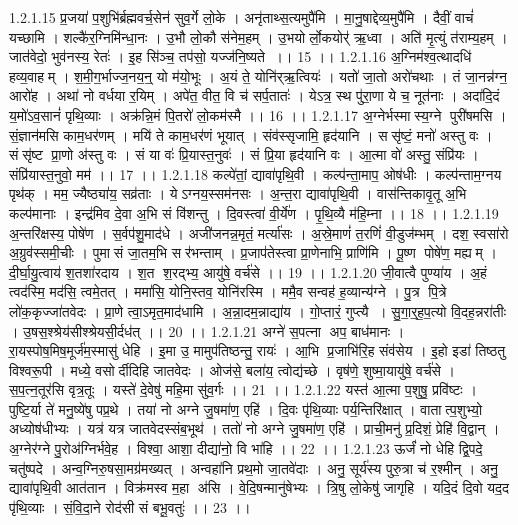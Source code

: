 1.2.1.15
प्र॒जया॑ प॒शुभि॑र्ब्रह्मवर्च॒सेन॑ सुव॒र्गे लो॒के । अनृ॑ताथ्स॒त्यमुपै॑मि । मा॒नु॒षाद्देव्य॒मुपै॑मि । दैवीं॒ वाचं॑ यच्छामि । शल्कै॑र॒ग्निमि॑न्धा॒नः । उ॒भौ लो॒कौ स॑नेम॒हम् । उ॒भयोर्लो॒कयोर्॑ ऋ॒ध्वा । अति॑ मृ॒त्युं त॑राम्य॒हम् । जात॑वेदो॒ भुव॑नस्य॒ रेतः॑ । इ॒ह सि॑ञ्च॒ तप॑सो॒ यज्ज॑नि॒ष्यते ।। 15 ।।
1.2.1.16
अ॒ग्निम॑श्व॒त्थादधि॑ हव्य॒वाहम् । श॒मी॒ग॒र्भाज्ज॒नय॒न्॒ यो म॑यो॒भूः । अ॒यं ते॒ योनि॑र्‌ऋ॒त्वियः॑ । यतो॑ जा॒तो अरो॑चथाः । तं जा॒नन्न॑ग्न॒ आरो॑ह । अथा॑ नो वर्धया र॒यिम् । अपे॑त॒ वीत॒ वि च॑ सर्प॒तातः॑ । येऽत्र॒ स्थ पु॑रा॒णा ये च॒ नूत॑नाः । अदा॑दि॒दं य॒मो॑ऽव॒सानं॑ पृथि॒व्याः । अक्र॑न्नि॒मं पि॒तरो॑ लो॒कम॑स्मै ।। 16 ।।
1.2.1.17
अ॒ग्नेर्भस्मास्य॒ग्ने पुरी॑षमसि । सं॒ज्ञान॑मसि काम॒धर॑णम् । मयि॑ ते काम॒धर॑णं भूयात् । संव॑स्सृजामि॒ हृद॑यानि । ससृ॑ष्टं॒ मनो॑ अस्तु वः । संसृ॑ष्ट प्रा॒णो अ॑स्तु वः । सं या वः॑ प्रि॒यास्त॒नुवः॑ । सं प्रि॒या हृद॑यानि वः । आ॒त्मा वो॑ अस्तु॒ संप्रि॑यः । संप्रि॑यास्त॒नुवो॒ मम॑ ।। 17 ।।
1.2.1.18
कल्पे॑तां॒ द्यावा॑पृथि॒वी । कल्प॑न्ता॒माप॒ ओष॑धीः । कल्प॑न्ताम॒ग्नय॒ पृथ॑क् । मम॒ ज्यैष्ठ्या॑य॒ सव्र॑ताः । येऽग्नय॒स्सम॑नसः । अ॒न्त॒रा द्यावा॑पृथि॒वी । वास॑न्तिकावृ॒तू अ॒भि कल्प॑मानाः । इन्द्र॑मिव दे॒वा अ॒भि सं वि॑शन्तु । दि॒वस्त्वा॑ वी॒र्ये॑ण । पृ॒थि॒व्यै म॑हि॒म्ना ।। 18 ।।
1.2.1.19
अ॒न्तरि॑क्षस्य॒ पोषे॑ण । स॒र्वप॑शु॒माद॑धे । अजी॑जनन्न॒मृतं॒ मर्त्या॑सः । अ॒स्रे॒माणं॑ त॒रणिं॑ वी॒डुज॑म्भम् । दश॒ स्वसा॑रो अ॒ग्रुव॑स्समी॒चीः । पुमा॑सं जा॒तम॒भि सर॑भन्ताम् । प्र॒जाप॑तेस्त्वा प्रा॒णेनाभि॒ प्राणि॑मि । पू॒ष्ण पोषे॑ण॒ मह्यम् । दी॒र्घा॒यु॒त्वाय॑ श॒तशा॑रदाय । श॒त श॒रद्भ्य॒ आयु॑षे॒ वर्च॑से ।। 19 ।।
1.2.1.20
जी॒वात्वै पुण्या॑य । अ॒हं त्वद॑स्मि॒ मद॑सि॒ त्वमे॒तत् । ममा॑सि॒ योनि॒स्तव॒ योनि॑रस्मि । ममै॒व सन्वह॑ ह॒व्यान्य॑ग्ने । पु॒त्र पि॒त्रे लो॑क॒कृज्जा॑तवेदः । प्रा॒णे त्वा॒ऽमृत॒माद॑धामि । अ॒न्ना॒दम॒न्नाद्या॑य । गो॒प्तारं॒ गुप्त्यै । सु॒गा॒र्॒ह॒प॒त्यो वि॒दह॒न्नरा॑तीः । उ॒षस॒श्श्रेय॑सीश्श्रेयसी॒र्दध॑त् ।। 20 ।।
1.2.1.21
अग्ने॑ स॒पत्ना॑ अप॒ बाध॑मानः । रा॒यस्पोष॒मिष॒मूर्ज॑म॒स्मासु॑ धेहि । इ॒मा उ॒ मामुप॑तिष्ठन्तु॒ रायः॑ । आ॒भि प्र॒जाभि॑रि॒ह संव॑सेय । इ॒हो इडा॑ तिष्ठतु विश्वरू॒पी । मध्ये॒ वसोर्दीदिहि जातवेदः । ओज॑से॒ बला॑य॒ त्वोद्य॑च्छे । वृष॑णे॒ शुष्मा॒यायु॑षे॒ वर्च॑से । स॒प॒त्न॒तूर॑सि वृत्र॒तूः । यस्ते॑ दे॒वेषु॑ महि॒मा सु॑व॒र्गः ।। 21 ।।
1.2.1.22
यस्त॑ आ॒त्मा प॒शुषु॒ प्रवि॑ष्टः । पुष्टि॒र्या ते॑ मनु॒ष्ये॑षु पप्र॒थे । तया॑ नो अग्ने जु॒षमा॑ण॒ एहि॑ । दि॒वः पृ॑थि॒व्याः पर्य॒न्तिरि॑क्षात् । वातात्प॒शुभ्यो॒ अध्योष॑धीभ्यः । यत्र॑ यत्र जातवेदस्संब॒भूथ॑ । ततो॑ नो अग्ने जु॒षमा॑ण॒ एहि॑ । प्राची॒मनु॑ प्र॒दिशं॒ प्रेहि॑ वि॒द्वान् । अ॒ग्नेर॑ग्ने पु॒रोअ॑ग्निर्भवे॒ह । विश्वा॒ आशा॒ दीद्या॑नो॒ वि भा॑हि ।। 22 ।।
1.2.1.23
ऊर्जं॑ नो धेहि द्वि॒पदे॒ चतु॑ष्पदे । अन्व॒ग्निरु॒षसा॒मग्र॑मख्यत् । अन्वहा॑नि प्रथ॒मो जा॒तवे॑दाः । अनु॒ सूर्य॑स्य पुरु॒त्रा च॑ र॒श्मीन् । अनु॒ द्यावा॑पृथि॒वी आत॑तान । विक्र॑मस्व म॒हा अ॑सि । वे॒दि॒षन्मानु॑षेभ्यः । त्रि॒षु लो॒केषु॑ जागृहि । यदि॒दं दि॒वो यद॒द पृ॑थि॒व्याः । सं॒वि॒दा॒ने रोद॑सी सं बभू॒वतुः॑ ।। 23 ।।
